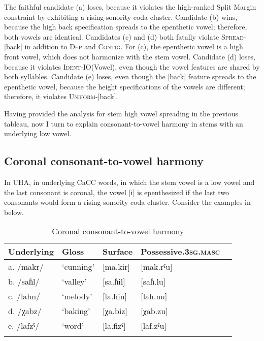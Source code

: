 \documentclass[output=paper,colorlinks,citecolor=brown]{langscibook}
\begin{document}
The faithful candidate (a) loses, because it violates the high-ranked Split Margin constraint by exhibiting a rising-sonority coda cluster. Candidate (b) wins, because the high back specification  spreads to the epenthetic vowel; therefore, both vowels are identical. Candidates (c) and (d) both  fatally violate \textsc{Spread}-[back] in addition to \textsc{Dep} and \textsc{Contig}. For (c), the epenthetic vowel is a high front vowel, which does not harmonize with the stem vowel. Candidate (d) loses, because it violates \textsc{Ident}-IO(Vowel), even though the vowel features are shared by both syllables. Candidate (e) loses, even though the [back] feature spreads to the epenthetic vowel, because the height specifications of the vowels are different; therefore, it violates \textsc{Uniform}-[back]. 

Having provided the analysis for stem high vowel spreading in the previous tableau, now I turn to explain consonant-to-vowel harmony in stems with an underlying low vowel.


\subsection{Coronal consonant-to-vowel harmony}
In UHA, in underlying CaCC words, in which the stem vowel is a low vowel and the last consonant is coronal, the vowel [i] is epenthesized if the last two consonants would form a rising-sonority coda cluster. Consider the examples in  below.

\begin{table}
\caption{Coronal consonant-to-vowel harmony}
\label{corC}
\begin{tabular}{lllll}
\lsptoprule
Underlying & Gloss & Surface & Possessive.3\textsc{sg}.\textsc{masc} \\\midrule
a. /makr/   &   ‘cunning’   &   [ma.kir]    &   [mak.rˤu] \\
b. /saɦl/   &   ‘valley’    &   [sa.ɦil]    &   [saɦ.lu] \\
c. /laħn/   &   ‘melody’    &   [la.ħin]    &   [laħ.nu] \\
d. /χabz/   &   ‘baking’    &   [χa.biz]    &   [χab.zu] \\
e. /lafzˤ/  &   ‘word’      &   [la.fizˤ]   &   [laf.zˤu] \\
\lspbottomrule                
\end{tabular}
\end{table}
\end{document}
